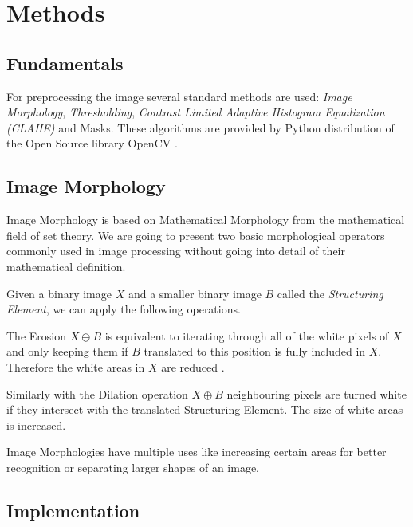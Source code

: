 
\section{Methods}

\subsection{Fundamentals}

For preprocessing the image several standard methods are used: \textit{Image
Morphology}, \textit{Thresholding}, \textit{Contrast Limited Adaptive Histogram
Equalization (CLAHE)} and Masks. These algorithms are provided by Python
distribution of the Open Source library OpenCV \cite{opencv_library}.

\subsection{Image Morphology}

Image Morphology is based on Mathematical Morphology from the mathematical field
of set theory. We are going to present two basic morphological operators
commonly used in image processing without going into detail of their mathematical
definition.

Given a binary image $X$ and a smaller binary image $B$ called the
\textit{Structuring Element}, we can apply the following operations.

The Erosion $X \ominus B$ is equivalent to iterating through all of the white
pixels of $X$ and only keeping them if $B$ translated to this position is fully
included in $X$. Therefore the white areas in $X$ are reduced \cite{Smith1997}.

Similarly with the Dilation operation $X \oplus B$ neighbouring pixels are
turned white if they intersect with the translated Structuring Element. The size
of white areas is increased.

Image Morphologies have multiple uses like increasing certain areas for better
recognition or separating larger shapes of an image.


\subsection{Implementation}


